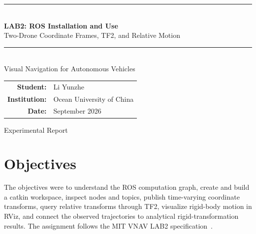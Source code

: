 \documentclass[11pt,a4paper]{article}
\begin{document}
\begin{titlepage}
  \centering
  \vspace*{2.2cm}
  {\color{oucblue}\rule{\textwidth}{1.2pt}}\\[1.2cm]
  {\Huge\bfseries LAB2: ROS Installation and Use\\[0.35cm]}
  {\Large Two-Drone Coordinate Frames, TF2, and Relative Motion}\par
  \vspace{1.1cm}
  {\color{oucblue}\rule{0.76\textwidth}{0.8pt}}\\[1.8cm]
  {\Large Visual Navigation for Autonomous Vehicles}\par
  \vspace{2.0cm}
  \begin{tabular}{rl}
    \textbf{Student:} & Li Yunzhe\\[0.25cm]
    \textbf{Institution:} & Ocean University of China\\[0.25cm]
    \textbf{Date:} & September 2026
  \end{tabular}
  \vfill
  {\large Experimental Report}
\end{titlepage}

\begin{abstract}
This experiment established a ROS Noetic development environment and implemented a two-drone rigid-transform scenario. A dynamic transform broadcaster generated the prescribed AV1 and AV2 poses at 50~Hz, while a TF2 listener recovered world-frame and relative-frame trajectories for RViz visualization. The catkin workspace compiled without warnings or failures. Runtime measurement gave a transform publication rate of 50.000~Hz. A synchronized 40-sample numerical test produced maximum errors of $2.220\times10^{-16}$ for the AV1 trajectory radius, $2.989\times10^{-16}$ for the AV2 world trajectory, $4.441\times10^{-16}$ for AV1 yaw, and $8.083\times10^{-16}$ for the relative position. The analytical derivation further shows that AV2 follows a parabola in the world $x_w$--$z_w$ plane and an ellipse on an oblique plane when observed from AV1. Quaternion operator identities and the equivalence between reversed intrinsic and extrinsic rotation sequences are also proved.
\end{abstract}

\section{Objectives}

The objectives were to understand the ROS computation graph, create and build a catkin workspace, inspect nodes and topics, publish time-varying coordinate transforms, query relative transforms through TF2, visualize rigid-body motion in RViz, and connect the observed trajectories to analytical rigid-transformation results. The assignment follows the MIT VNAV LAB2 specification~\cite{mitlab2}.
\end{document}
